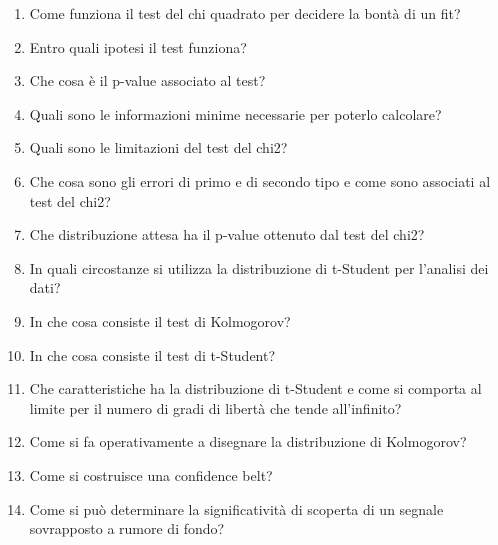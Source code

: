 \begin{enumerate}
	\item Come funziona il test del chi quadrato per decidere la bont\`{a} di un fit?
	\item Entro quali ipotesi il test funziona?
	\item Che cosa \`{e} il p-value associato al test?
	\item Quali sono le informazioni minime necessarie per poterlo calcolare?
	\item Quali sono le limitazioni del test del chi2?
	\item Che cosa sono gli errori di primo e di secondo tipo e come sono associati al test del chi2?
	\item Che distribuzione attesa ha il p-value ottenuto dal test del chi2?
	\item In quali circostanze si utilizza la distribuzione di t-Student per l'analisi dei dati?
	\item In che cosa consiste il test di Kolmogorov?
	\item In che cosa consiste il test di t-Student?
	\item Che caratteristiche ha la distribuzione di t-Student e come si comporta al limite per il  numero di gradi di libert\`{a} che tende all'infinito?
	\item Come si fa operativamente a disegnare la distribuzione di Kolmogorov?
	\item Come si costruisce una confidence belt?
	\item Come si può determinare la significativit\`{a} di scoperta di un segnale sovrapposto a rumore di fondo?

\end{enumerate}
